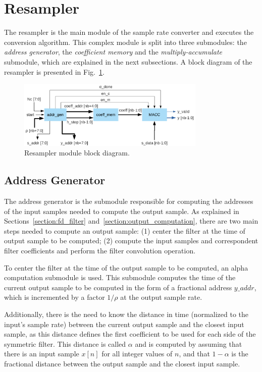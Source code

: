 \section{Resampler}
\label{section:resampler}

The resampler is the main module of the sample rate converter and executes the
conversion algorithm. This complex module is split into three submodules: the
\textit{address generator}, the \textit{coefficient memory} and the
\textit{multiply-accumulate} submodule, which are explained in the next
subsections. A block diagram of the resampler is presented in
Fig.~\ref{fig:bd_resampler}.

\begin{figure}[!htb]
  \centering
  \includegraphics[width=0.8\textwidth]{Figures/asrc_resampler_bd.png}
  \caption{Resampler module block diagram.}
  \label{fig:bd_resampler}
\end{figure}

\subsection{Address Generator}
\label{subsection:addr_gen}

The address generator is the submodule responsible for computing the addresses
of the input samples needed to compute the output sample. As explained in
Sections~\ref{section:fd_filter} and~\ref{section:output_computation}, there
are two main steps needed to compute an output sample: (1) center the filter at
the time of output sample to be computed; (2) compute the input samples and
correspondent filter coefficients and perform the filter convolution operation.

To center the filter at the time of the output sample to be computed, an alpha
computation submodule is used. This submodule computes the time of the current
output sample to be computed in the form of a fractional address $y\_addr$,
which is incremented by a factor $1/\rho$ at the output sample rate.

Additionally, there is the need to know the distance in time (normalized to the
input's sample rate) between the current output sample and the closest input
sample, as this distance defines the first coefficient to be used for each side
of the symmetric filter. This distance is called $\alpha$ and is computed by
assuming that there is an input sample $x[n]$ for all integer values of $n$, and
that $1-\alpha$ is the fractional distance between the output sample and the
closest input sample.

